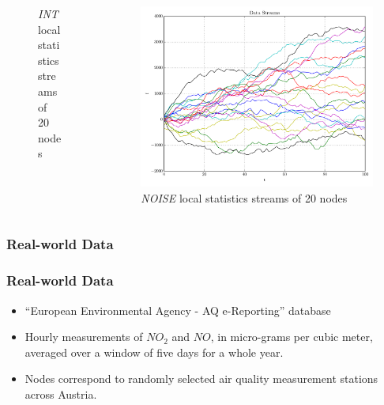 \documentclass[hyperref={pdfpagelabels=false}]{beamer}
\begin{document}
\begin{frame}
\begin{columns}
\begin{column}[t]{0.32\linewidth}
\begin{figure}
\caption{\emph{INT} local statistics streams of 20 nodes} 
\end{figure}
\end{column}
\begin{column}[t]{0.32\linewidth}
\begin{figure}
\vspace{-1cm}
\centering
\includegraphics[scale=0.16]{../img/noisyinterweaving1D20N_streams.pdf}
\caption{\emph{NOISE} local statistics streams of 20 nodes} 
\end{figure}
\end{column}
\end{columns}
\end{frame}

\subsubsection*{Real-world Data}
\begin{frame} \frametitle{Real-world Data}
\begin{itemize}
\item ``European Environmental Agency - AQ e-Reporting'' database
\item Hourly measurements of $NO_2$ and $NO$, in micro-grams per cubic meter, averaged over a window of five days for a whole year.
\item Nodes correspond to randomly selected air quality measurement stations across Austria.
\end{itemize}
\end{frame}
\end{document}
